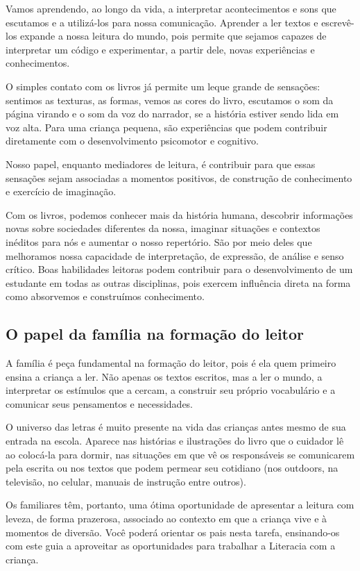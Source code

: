 \documentclass[11pt]{extarticle}
\begin{document}
Vamos aprendendo, ao longo da vida, a interpretar acontecimentos 
e sons que escutamos e a utilizá-los para nossa comunicação. Aprender a ler textos e 
escrevê-los expande a nossa leitura do mundo, pois permite que sejamos capazes de 
interpretar um código e experimentar, a partir dele, novas experiências e conhecimentos. 

O simples contato com os livros já permite um leque grande de sensações: 
sentimos as texturas, as formas, vemos as cores do livro, escutamos o som da página 
virando e o som da voz do narrador, se a história estiver sendo lida em voz alta. Para uma 
criança pequena, são experiências que podem contribuir diretamente com o desenvolvimento psicomotor 
e cognitivo. 

Nosso papel, enquanto mediadores de leitura, é contribuir para que essas 
sensações sejam associadas a momentos positivos, de construção de 
conhecimento e exercício de imaginação. 

Com os livros, podemos conhecer mais da história humana, descobrir informações 
novas sobre sociedades diferentes da nossa, imaginar situações e contextos inéditos 
para nós e aumentar o nosso repertório. São por meio deles que melhoramos nossa 
capacidade de interpretação, de expressão, de análise e senso crítico. Boas habilidades 
leitoras podem contribuir para o desenvolvimento de um estudante em todas as outras 
disciplinas, pois exercem influência direta na forma como absorvemos e 
construímos conhecimento.


\subsection{O papel da família na formação do leitor}
A família é peça fundamental na formação do leitor, pois é ela quem primeiro 
ensina a criança a ler. Não apenas os textos escritos, mas a ler o mundo, a 
interpretar os estímulos que a cercam, a construir seu próprio vocabulário e a 
comunicar seus pensamentos e necessidades.

O universo das letras é muito presente na vida das crianças antes mesmo de sua 
entrada na escola. Aparece nas histórias e ilustrações do livro que o cuidador 
lê ao colocá-la para dormir, nas situações em que vê os responsáveis se comunicarem 
pela escrita ou nos textos que podem permear seu cotidiano (nos outdoors, na 
televisão, no celular, manuais de instrução entre outros). 

Os familiares têm, 
portanto, uma ótima oportunidade de apresentar a leitura com leveza, de forma 
prazerosa, associado ao contexto em que a criança vive e à momentos de diversão. 
Você poderá orientar os pais nesta tarefa, ensinando-os com este guia a aproveitar 
as oportunidades para trabalhar a Literacia com a criança.
\end{document}
